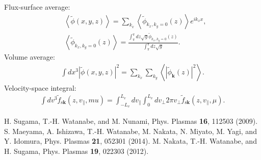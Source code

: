 Flux-surface average:
\begin{align}
  &\left\langle \tilde{\phi} (x,y,z) \right\rangle = \sum_{k_x} \left\langle \tilde{\phi}_{k_x,k_y=0}(z) \right\rangle e^{ik_xx}, \\
  &\left\langle \tilde{\phi}_{k_x,k_y=0}(z) \right\rangle = \frac{\int_\pi^\pi dz \sqrt{g} \tilde{\phi}_{k_x,k_y=0}(z)}{\int_\pi^\pi dz \sqrt{g}}.
\end{align}
Volume average:
\begin{align}
  \int dx^3 \left|\tilde{\phi}(x,y,z)\right|^2 = \sum_{k_x} \sum_{k_y} \left\langle \left| \tilde{\phi}_{\bm{k}} (z) \right|^2 \right\rangle.
\end{align}
Velocity-space integral:
\begin{align}
  \int dv^3 \tilde{f}_{\mathrm{s}\bm{k}}(z,v_\parallel,mu) = \int_{-L_v}^{L_v}dv_\parallel \int_0^{L_v} dv_\perp 2\pi v_\perp \tilde{f}_{\mathrm{s}\bm{k}}(z,v_\parallel,\mu).
\end{align}





\begin{thebibliography}{99}
  H. Sugama, T.-H. Watanabe, and M. Nunami,
  Phys. Plasmas {\bf 16}, 112503 (2009).
  S. Maeyama, A. Ishizawa, T.-H. Watanabe, M. Nakata, N. Miyato, M. Yagi, and Y. Idomura,
  Phys. Plasmas {\bf 21}, 052301 (2014).
  M. Nakata, T.-H. Watanabe, and H. Sugama,
  Phys. Plasmas {\bf 19}, 022303 (2012).
\end{thebibliography}